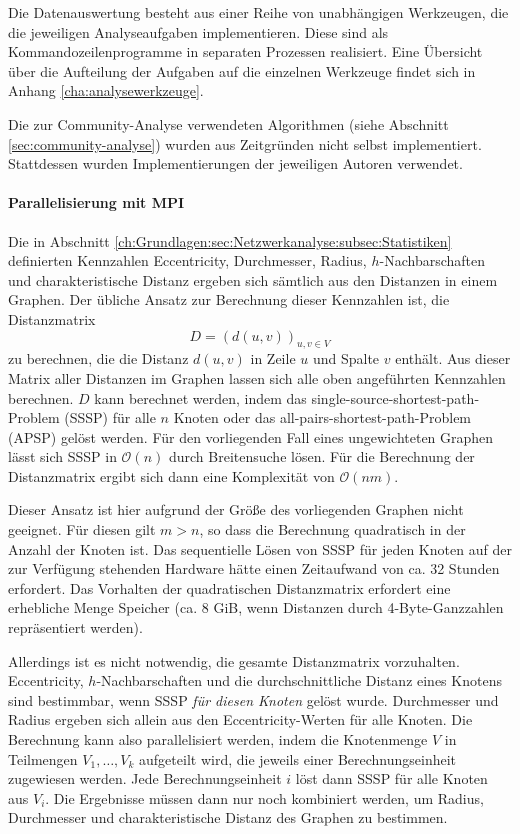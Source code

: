 Die Datenauswertung besteht aus einer Reihe von unabhängigen
Werkzeugen, die die jeweiligen Analyseaufgaben implementieren. Diese
sind als Kommandozeilenprogramme in separaten Prozessen
realisiert. Eine Übersicht über die Aufteilung der Aufgaben auf
die einzelnen Werkzeuge findet sich in Anhang
\ref{cha:analysewerkzeuge}.

Die zur Community-Analyse verwendeten Algorithmen (siehe Abschnitt
\ref{sec:community-analyse}) wurden aus Zeitgründen nicht selbst
implementiert. Stattdessen wurden Implementierungen der jeweiligen
Autoren verwendet.

\paragraph{Parallelisierung mit MPI}
\label{sec:parall-mitt-mpi}

Die in Abschnitt
\ref{ch:Grundlagen:sec:Netzwerkanalyse:subsec:Statistiken} definierten
Kennzahlen Eccentricity, Durchmesser, Radius, $h$-Nachbarschaften und
charakteristische Distanz ergeben sich sämtlich aus den Distanzen in
einem Graphen. Der übliche Ansatz zur Berechnung dieser Kennzahlen
ist, die Distanzmatrix
\begin{equation}
  \label{eq:7}
  D = (d(u, v))_{u, v\in V}
\end{equation}
zu berechnen, die die Distanz $d(u, v)$ in Zeile $u$ und Spalte $v$
enthält\cite{Brinkmeier2004}. Aus dieser Matrix aller Distanzen im
Graphen lassen sich alle oben angeführten Kennzahlen berechnen. $D$
kann berechnet werden, indem das single-source-shortest-path-Problem
(SSSP) für alle $n$ Knoten oder das all-pairs-shortest-path-Problem
(APSP) gelöst werden. Für den vorliegenden Fall eines
ungewichteten Graphen lässt sich SSSP in $\mathcal{O}(n)$ durch
Breitensuche lösen. Für die Berechnung der Distanzmatrix ergibt
sich dann eine Komplexität von $\mathcal{O}(nm)$.

Dieser Ansatz ist hier aufgrund der Größe des vorliegenden Graphen
nicht geeignet. Für diesen gilt $m > n$, so dass die Berechnung
quadratisch in der Anzahl der Knoten ist. Das sequentielle Lösen von
SSSP für jeden Knoten auf der zur Verfügung stehenden Hardware
hätte einen Zeitaufwand von ca. 32 Stunden erfordert. Das Vorhalten
der quadratischen Distanzmatrix erfordert eine erhebliche Menge
Speicher (ca. 8 GiB, wenn Distanzen durch 4-Byte-Ganzzahlen
repräsentiert werden).

Allerdings ist es nicht notwendig, die gesamte Distanzmatrix
vorzuhalten. Eccentricity, $h$-Nachbarschaften und die
durchschnittliche Distanz eines Knotens sind bestimmbar, wenn SSSP
\emph{für diesen Knoten} gelöst wurde. Durchmesser und Radius
ergeben sich allein aus den Eccentricity-Werten für alle Knoten. Die
Berechnung kann also parallelisiert werden, indem die Knotenmenge $V$
in Teilmengen $V_1, \dots, V_k$ aufgeteilt wird, die jeweils einer
Berechnungseinheit zugewiesen werden. Jede Berechnungseinheit $i$
löst dann SSSP für alle Knoten aus $V_i$. Die Ergebnisse müssen
dann nur noch kombiniert werden, um Radius, Durchmesser und
charakteristische Distanz des Graphen zu bestimmen.

